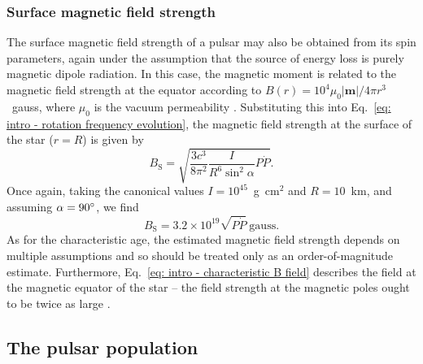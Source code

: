 \subsubsection{Surface magnetic field strength}
\label{sec: intro - general intro - spin parameters - surface B field}

The surface magnetic field strength of a pulsar may also be obtained from its spin parameters, again under the assumption that the source of energy loss is purely magnetic dipole radiation. In this case, the magnetic moment is related to the magnetic field strength at the equator according to $B(r) = 10^4 \mu_0 |\mathbf{m}|/4\pi r^3$~gauss, where $\mu_0$ is the vacuum permeability \citep[e.g.][]{Jxxx1962}. Substituting this into Eq.~\eqref{eq: intro - rotation frequency evolution}, the magnetic field strength at the surface of the star ($r=R$) is given by
\begin{equation}
    \label{eq: intro - pulsar field strength}
    B_\mathrm{S} = \sqrt{\frac{3c^3}{8\pi^2}\frac{I}{R^6 \sin^2\alpha}P\dot{P}}.
\end{equation}
Once again, taking the canonical values $I=10^{45}$~g~cm$^2$ and $R=10$~km, and assuming $\alpha = 90^\circ$, we find
\begin{equation}
    \label{eq: intro - characteristic B field}
    B_\mathrm{S} = 3.2\times 10^{19} \sqrt{P\dot{P}} \mathrm{\ gauss}.
\end{equation}
As for the characteristic age, the estimated magnetic field strength depends on multiple assumptions and so should be treated only as an order-of-magnitude estimate. Furthermore, Eq.~\eqref{eq: intro - characteristic B field} describes the field at the magnetic equator of the star -- the field strength at the magnetic poles ought to be twice as large \citep{STxx1983,UMxx1995}.




















\subsection{The pulsar population}
\label{sec: intro - general intro - pulsar population}

